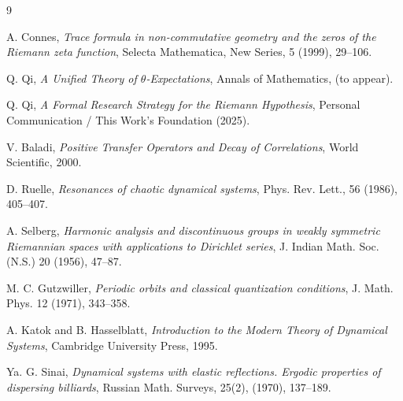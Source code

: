 \documentclass[12pt, letterpaper]{amsart}
\theoremstyle{plain}
\theoremstyle{definition}
\theoremstyle{remark}
\begin{document}
\begin{thebibliography}{9}

A. Connes,
\textit{Trace formula in non-commutative geometry and the zeros of the Riemann zeta function},
Selecta Mathematica, New Series, 5 (1999), 29--106.

Q. Qi,
\textit{A Unified Theory of $\theta$-Expectations},
Annals of Mathematics, (to appear).

Q. Qi,
\textit{A Formal Research Strategy for the Riemann Hypothesis},
Personal Communication / This Work's Foundation (2025).

V. Baladi,
\textit{Positive Transfer Operators and Decay of Correlations},
World Scientific, 2000.

D. Ruelle,
\textit{Resonances of chaotic dynamical systems},
Phys. Rev. Lett., 56 (1986), 405--407.

A. Selberg,
\textit{Harmonic analysis and discontinuous groups in weakly symmetric Riemannian spaces with applications to Dirichlet series},
J. Indian Math. Soc. (N.S.) 20 (1956), 47--87.

M. C. Gutzwiller,
\textit{Periodic orbits and classical quantization conditions},
J. Math. Phys. 12 (1971), 343--358.

A. Katok and B. Hasselblatt,
\textit{Introduction to the Modern Theory of Dynamical Systems},
Cambridge University Press, 1995.

 Ya. G. Sinai, \textit{Dynamical systems with elastic reflections. Ergodic properties of dispersing billiards}, Russian Math. Surveys, 25(2), (1970), 137–189.

\end{thebibliography}
\end{document}
